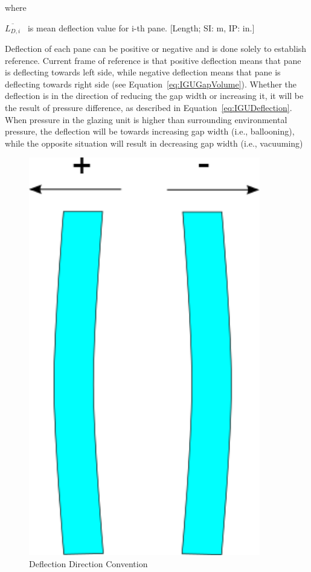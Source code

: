 where

\(\overline {{L_{D,i}}}\) ~is mean deflection value for i-th pane. {[}Length; SI: m, IP: in.{]}

Deflection of each pane can be positive or negative and is done solely to establish reference. Current frame of reference is that positive deflection means that pane is deflecting towards left side, while negative deflection means that pane is deflecting towards right side (see Equation~\ref{eq:IGUGapVolume}). Whether the deflection is in the direction of reducing the gap width or increasing it, it will be the result of pressure difference, as described in Equation~\ref{eq:IGUDeflection}. When pressure in the glazing unit is higher than surrounding environmental pressure, the deflection will be towards increasing gap width (i.e., ballooning), while the opposite situation will result in decreasing gap width (i.e., vacuuming)

\begin{figure}[hbtp] %
\centering
\includegraphics[width=0.9\textwidth, height=0.9\textheight, keepaspectratio=true]{media/image1787.png}
\caption{Deflection Direction Convention \protect \label{fig:deflection-direction-convention}}
\end{figure}

